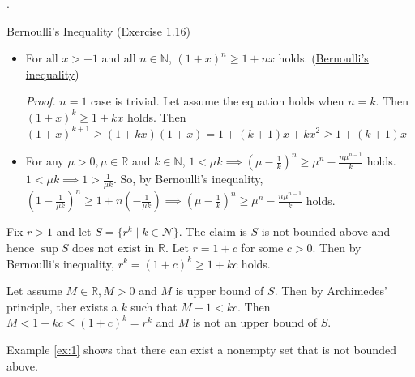 \documentclass[8pt]{beamer}
\newcommand{\mbb}[1]{\mathbb{#1}}
\newcommand{\mc}[1]{\mathcal{#1}}
\newcommand{\ti}[1]{\textit{#1}}
\begin{document}
\begin{frame}{.}
    \begin{block}{Bernoulli's Inequality (Exercise 1.16)}
        \begin{itemize}
            \item  For all $x > -1$ and all $n \in \mbb{N}$, $(1+x)^n \geq 1 + nx$ holds. (\underline{Bernoulli's inequality})

            \ti{Proof.} $n=1$ case is trivial.
            Let assume the equation holds when $n=k$.
            Then $(1+x)^k \geq 1+ kx$ holds.
            Then $(1+x)^{k+1} \geq (1+kx)(1+x) = 1 + (k+1)x + kx^2 \geq 1 + (k+1)x$

            \item For any $\mu > 0, \mu \in \mbb{R}$ and $k \in \mbb{N}$, $1 < \mu k \implies (\mu - \frac{1}{k})^n \geq \mu^n - \frac{n \mu^{n-1}}{k}$ holds.
            $1 < \mu k \implies 1 > \frac{1}{\mu k}$. So, by Bernoulli's inequality, $(1 - \frac{1}{\mu k})^n \geq  1 + n(-\frac{1}{\mu k}) \implies (\mu - \frac{1}{k})^n \geq \mu^n - \frac{n \mu^{n-1}}{k}$ holds.
        \end{itemize}
    \end{block}

    \begin{example} \label{ex:1}
        Fix $r >1$ and let $S = \{r^k \mid k \in \mc{N}\}$.
        The claim is $S$ is not bounded above and hence $\sup S$ does not exist in $\mbb{R}$.
        Let $r = 1+c$ for some $c >0$.
        Then by Bernoulli's inequality, $r^k = (1+c)^k \geq 1+kc$ holds.

        Let assume $M \in \mbb{R}, M >0$ and $M$ is upper bound of $S$.
        Then by Archimedes' principle, ther exists a $k$ such that $M - 1 < kc$.
        Then $M < 1+kc \leq (1+c)^k = r^k$ and $M$ is not an upper bound of $S$.
    \end{example}

    Example \ref{ex:1} shows that there can exist a nonempty set that is not bounded above.
\end{frame}
\end{document}
